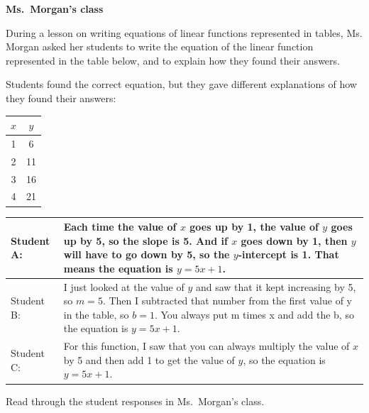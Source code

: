 \documentclass[11pt]{article}
\theoremstyle{definition}
\begin{document}
\begin{mdframed}
\begin{center} {\bf Ms.~Morgan's class} \end{center}
\begin{minipage}{5in}\raggedright \parskip4pt
During a lesson on writing equations of linear functions represented in tables, Ms. Morgan
asked her students to write the equation of the linear function represented in the table below,
and to explain how they found their answers.

Students found the correct equation, but they gave different explanations of how they found
their answers:
\end{minipage}
\begin{minipage}{1in}
\vspace*{-20pt}
\begin{center}\begin{tabular}{c|c}
$x$ & $y$ \\ \hline
1 & 6  \\ 
2 & 11 \\ 
3 & 16 \\
4 & 21 
\end{tabular}
\end{center}
\end{minipage}

\begin{tabular}{L{0.75in}L{5in}}
\hline
Student A: & Each time the value of $x$ goes up by 1, the value of $y$ goes up by 5, so the
slope is 5. And if $x$ goes down by 1, then $y$ will have to go down by 5, so
the $y$-intercept is 1. That means the equation is $y = 5x + 1$.
\\ \hline
Student B: &  I just looked at the value of $y$ and saw that it kept increasing by 5, so $m =
5$. Then I subtracted that number from the first value
of y in the table, so $b = 1$. You always put m times x and add the b, so the
equation is $y = 5x + 1$.
\\ \hline
Student C: & For this function, I saw that you can always multiply the value of $x$ by 5
and then add 1 to get the value of $y$, so the equation is $y = 5x + 1.$
\\ \hline
\end{tabular}
\end{mdframed}

Read through the student responses in Ms.~Morgan's class.
\end{document}
